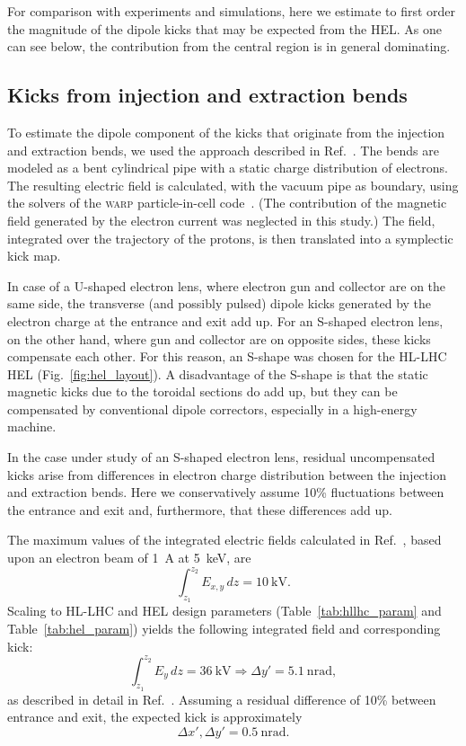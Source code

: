 \documentclass[aps
,prstab
,reprint
,longbibliography
,preprintnumbers
,showkeys
,amsfonts,amssymb,amsmath
,floatfix
]{revtex4-1}
\newcommand{\q}[2]{\ensuremath{#1\ \mathrm{#2}}} %
\newcommand{\code}[1]{\textsc{#1}} %
\begin{document}
For comparison with experiments and simulations, here we estimate to
first order the magnitude of the dipole kicks that may be expected
from the HEL. As one can see below, the contribution from the central
region is in general dominating.


\subsection{Kicks from injection and extraction bends}
\label{core:sec:1}

To estimate the dipole component of the kicks that originate from the
injection and extraction bends, we used the approach described in
Ref.~\cite{hel_bends_stancari}. The bends are modeled as a bent
cylindrical pipe with a static charge distribution of electrons. The
resulting electric field is calculated, with the vacuum pipe as
boundary, using the solvers of the \code{warp} particle-in-cell
code~\cite{warp, Friedman:IEEE-plasma:2014}. (The contribution of the
magnetic field generated by the electron current was neglected in this
study.) The field, integrated over the trajectory of the protons, is
then translated into a symplectic kick map.

In case of a U-shaped electron lens, where electron gun and collector
are on the same side, the transverse (and possibly pulsed) dipole
kicks generated by the electron charge at the entrance and exit add
up. For an S-shaped electron lens, on the other hand, where gun and
collector are on opposite sides, these kicks compensate each
other. For this reason, an S-shape was chosen for the HL-LHC HEL
(Fig.~\ref{fig:hel_layout}). A disadvantage of the S-shape is that the
static magnetic kicks due to the toroidal sections do add up, but they
can be compensated by conventional dipole correctors, especially in a
high-energy machine.

In the case under study of an S-shaped electron lens, residual
uncompensated kicks arise from differences in electron charge
distribution between the injection and extraction bends. Here we
conservatively assume 10\% fluctuations between the entrance and exit
and, furthermore, that these differences add up.

The maximum values of the integrated electric fields calculated in
Ref.~\cite{hel_bends_stancari}, based upon an electron beam of 1~A at
5~keV, are
%
\begin{equation}
  \int_{z_1}^{z_2} E_{x,y} \, dz= \q{10}{kV}.
\end{equation}
%
Scaling to HL-LHC and HEL design parameters
(Table~\ref{tab:hllhc_param} and Table~\ref{tab:hel_param}) yields the
following integrated field and corresponding kick:
%
\begin{equation}
  \int_{z_1}^{z_2} E_{y} \, dz = \q{36}{kV} \Rightarrow \Delta y' = \q{5.1}{nrad},
\end{equation}
%
as described in detail in
Ref.~\cite{md_sim_hel_res_ex_fitterer}. Assuming a residual difference
of 10\% between entrance and exit, the expected kick is approximately
%
\begin{equation}
  \label{eqn:kick_bends}
  \Delta x', \Delta y' = \q{0.5}{nrad}.
\end{equation}
\end{document}
